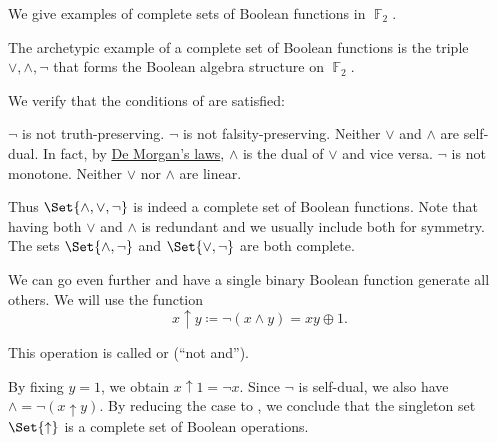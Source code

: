 \begin{example}\label{ex:posts_completeness_theorem}
  We give examples of complete sets of Boolean functions in \( \BbbF_2 \).

  \begin{ExEnum}
     The archetypic example of a complete set of Boolean functions is the triple \( \vee, \wedge, \neg \) that forms the Boolean algebra structure on \( \BbbF_2 \).

    We verify that the conditions of  are satisfied:
    \begin{RefList}
       \( \neg \) is not truth-preserving.
       \( \neg \) is not falsity-preserving.
       Neither \( \vee \) and \( \wedge \) are self-dual. In fact, by \hyperref[thm:de_morgans_laws]{De Morgan's laws}, \( \wedge \) is the dual of \( \vee \) and vice versa.
       \( \neg \) is not monotone.
       Neither \( \vee \) nor \( \wedge \) are linear.
    \end{RefList}

    Thus \( \Set{ \wedge, \vee, \neg } \) is indeed a complete set of Boolean functions. Note that having both \( \vee \) and \( \wedge \) is redundant and we usually include both for symmetry. The sets \( \Set{ \wedge, \neg } \) and \( \Set{ \vee, \neg } \) are both complete.

     We can go even further and have a single binary Boolean function generate all others. We will use the function
    \begin{equation}\label{eq:ex:posts_completeness_theorem/nand}
      x \uparrow y \coloneqq \neg(x \wedge y) = xy \oplus 1.
    \end{equation}

    This operation is called  or  (\enquote{not and}).

    By fixing \( y = 1 \), we obtain \( x \uparrow 1 = \neg x \). Since \( \neg \) is self-dual, we also have \( \wedge = \neg(x \uparrow y) \). By reducing the case to , we conclude that the singleton set \( \Set{ \uparrow } \) is a complete set of Boolean operations.


\end{ExEnum}
\end{example}
